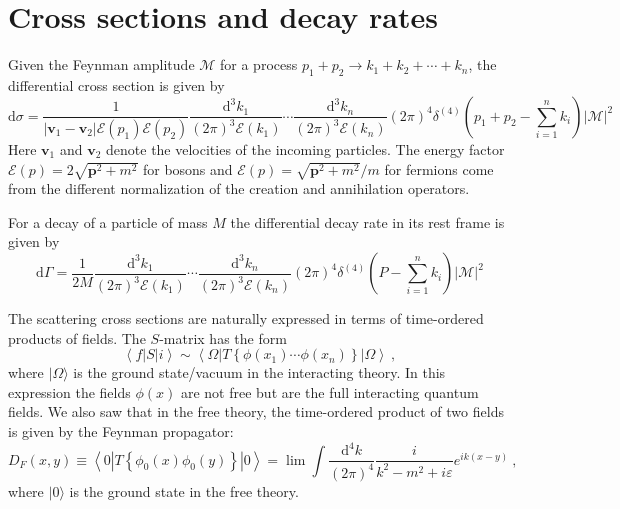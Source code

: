 \documentclass[11pt,a4paper]{article}
\renewcommand{\vec}[1]{\boldsymbol{#1}}
\newcommand{\dif}{\mathrm{d}}
\newcounter{theo}[section]\setcounter{theo}{0}
\begin{document}
\section{Cross sections and decay rates}
Given the Feynman amplitude $\mathcal M$ for a process $p_1 + p_2 \rightarrow k_1 + k_2 + \cdots + k_n$, the differential cross section is given by
\begin{equation}
\dif \sigma = \dfrac{1}{|\vec{v}_1 -\vec{v}_2| \mathcal E(p_1) \mathcal E(p_2)} \dfrac{\dif^3 k_1}{(2 \pi)^3 \mathcal E(k_1)} \cdots \dfrac{\dif^3 k_n}{(2 \pi)^3 \mathcal E(k_n)} (2 \pi)^4 \delta^{(4)} \left(p_1 +p_2 -\sum_{i=1}^n k_i \right) |\mathcal M|^2 
\end{equation}
Here $\vec{v}_1$ and $\vec{v}_2$ denote the velocities of the incoming particles. The energy factor $\mathcal E(p) = 2 \sqrt{\vec{p}^2 + m^2}$ for bosons and $\mathcal E(p) = \sqrt{\vec{p}^2 + m^2}/m$ for fermions come from the different normalization of the creation and annihilation operators.

For a decay of a particle of mass $M$ the differential decay rate in its rest frame is given by
\begin{equation}
\dif \Gamma = \dfrac{1}{2 M} \dfrac{\dif^3 k_1}{(2 \pi)^3 \mathcal E(k_1)} \cdots \dfrac{\dif^3 k_n}{(2 \pi)^3 \mathcal E(k_n)} (2 \pi)^4 \delta^{(4)} \left(P -\sum_{i=1}^n k_i \right) |\mathcal M|^2 
\end{equation}










\cite{2014qfts.book.....S} The scattering cross sections are naturally expressed in terms of time-ordered products of fields. The $S$-matrix has the form
\begin{equation}
\left\langle f |S|i \right\rangle \sim \left\langle \Omega | T\left\{\phi(x_1) \cdots \phi(x_n) \right\}|\Omega \right\rangle ~,
\end{equation}
where $|\Omega \rangle$ is the ground state/vacuum in the interacting theory. In this expression the fields $\phi(x)$ are not free but are the full interacting quantum fields. We also saw that in the free theory, the time-ordered product of two fields is given by the Feynman propagator:
\begin{equation}
D_F (x, y) \equiv \left\langle 0 | T\left\{\phi_0(x) \phi_0(y) \right\}| 0 \right\rangle = \lim \int \dfrac{\dif^4 k}{(2\pi)^4} \dfrac{i}{k^2 -m^2 +i \varepsilon} e^{ik(x-y)} ~,
\end{equation}
where $| 0 \rangle$ is the ground state in the free theory.
\end{document}
